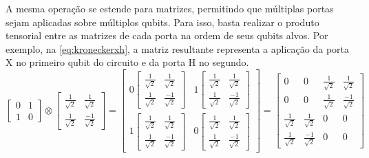 A mesma operação se estende para matrizes, permitindo que múltiplas portas sejam aplicadas sobre múltiplos qubits. Para isso, basta realizar o produto tensorial entre as matrizes de cada porta na ordem de seus qubits alvos. Por exemplo, na \cref{eq:kroneckerxh}, a matriz resultante representa a aplicação da porta X no primeiro qubit do circuito e da porta H no segundo.
\begin{equation}
  \begin{bmatrix}
    0 & 1 \\
    1 & 0
  \end{bmatrix}
  \otimes
  \begin{bmatrix}
    \frac{1}{\sqrt{2}} & \frac{1}{\sqrt{2}} \\
    \frac{1}{\sqrt{2}} & \frac{-1}{\sqrt{2}}
  \end{bmatrix}
  =
  \left[
  \begin{array}{cc}
  0\begin{bmatrix}
  \frac{1}{\sqrt{2}} & \frac{1}{\sqrt{2}} \\
  \frac{1}{\sqrt{2}} & \frac{-1}{\sqrt{2}}
  \end{bmatrix}
  &
  1\begin{bmatrix}
  \frac{1}{\sqrt{2}} & \frac{1}{\sqrt{2}} \\
  \frac{1}{\sqrt{2}} & \frac{-1}{\sqrt{2}}
  \end{bmatrix}
  \\[1ex]
  1\begin{bmatrix}
  \frac{1}{\sqrt{2}} & \frac{1}{\sqrt{2}} \\
  \frac{1}{\sqrt{2}} & \frac{-1}{\sqrt{2}}
  \end{bmatrix}
  &
  0\begin{bmatrix}
  \frac{1}{\sqrt{2}} & \frac{1}{\sqrt{2}} \\
  \frac{1}{\sqrt{2}} & \frac{-1}{\sqrt{2}}
  \end{bmatrix}
  \end{array}
  \right]
  =
  \begin{bmatrix}
    0 & 0 & \frac{1}{\sqrt{2}} & \frac{1}{\sqrt{2}} \\
    0 & 0 & \frac{1}{\sqrt{2}} & \frac{-1}{\sqrt{2}} \\
    \frac{1}{\sqrt{2}} & \frac{1}{\sqrt{2}} & 0 & 0 \\
    \frac{1}{\sqrt{2}} & \frac{-1}{\sqrt{2}} & 0 & 0
  \end{bmatrix}
  \label{eq:kroneckerxh}
\end{equation}

